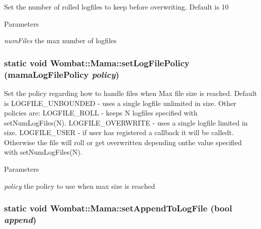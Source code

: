 Set the number of rolled logfiles to keep before overwriting. Default is 10 
\begin{DoxyParams}{Parameters}
\item[{\em numFiles}]the max number of logfiles \end{DoxyParams}
\hypertarget{classWombat_1_1Mama_abc6645dce35582824c1aba9b914ec1c6}{
\subsubsection[{setLogFilePolicy}]{\setlength{\rightskip}{0pt plus 5cm}static void Wombat::Mama::setLogFilePolicy (mamaLogFilePolicy {\em policy})}}
\label{classWombat_1_1Mama_abc6645dce35582824c1aba9b914ec1c6}


Set the policy regarding how to handle files when Max file size is reached. Default is LOGFILE\_\-UNBOUNDED -\/ uses a single logfile unlimited in size. Other policies are: LOGFILE\_\-ROLL -\/ keeps N logfiles specified with setNumLogFiles(N). LOGFILE\_\-OVERWRITE -\/ uses a single logfile limited in size. LOGFILE\_\-USER -\/ if user has registered a callback it will be calledt. Otherwise the file will roll or get overwritten depending onthe value specified with setNumLogFiles(N). 
\begin{DoxyParams}{Parameters}
\item[{\em policy}]the policy to use when max size is reached \end{DoxyParams}
\hypertarget{classWombat_1_1Mama_af3a1c2d479262325d8111425f98c2b4e}{
\subsubsection[{setAppendToLogFile}]{\setlength{\rightskip}{0pt plus 5cm}static void Wombat::Mama::setAppendToLogFile (bool {\em append})}}
\label{classWombat_1_1Mama_af3a1c2d479262325d8111425f98c2b4e}


